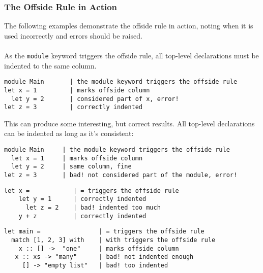 \documentclass{report}
\begin{document}
\subsubsection*{The Offside Rule in Action}
The following examples demonstrate the offside rule in action, noting when it is used incorrectly and errors should be raised.\\
\\
As the \verb|module| keyword triggers the offside rule, all top-level declarations must be indented to the same column.
\begin{verbatim}
module Main       | the module keyword triggers the offside rule
let x = 1         | marks offside column
  let y = 2       | considered part of x, error!
let z = 3         | correctly indented
\end{verbatim}
This can produce some interesting, but correct results. All top-level declarations can be indented as long as it's consistent:
\begin{verbatim}
module Main     | the module keyword triggers the offside rule
  let x = 1     | marks offside column
  let y = 2     | same column, fine 
let z = 3       | bad! not considered part of the module, error!
\end{verbatim}

\begin{verbatim}
let x =            | = triggers the offside rule
    let y = 1      | correctly indented
      let z = 2    | bad! indented too much
    y + z          | correctly indented
\end{verbatim}

\begin{verbatim}
let main =                | = triggers the offside rule
  match [1, 2, 3] with    | with triggers the offside rule
    x :: [] ->  "one"     | marks offside column
   x :: xs -> "many"      | bad! not indented enough
     [] -> "empty list"   | bad! too indented
\end{verbatim}
\end{document}
